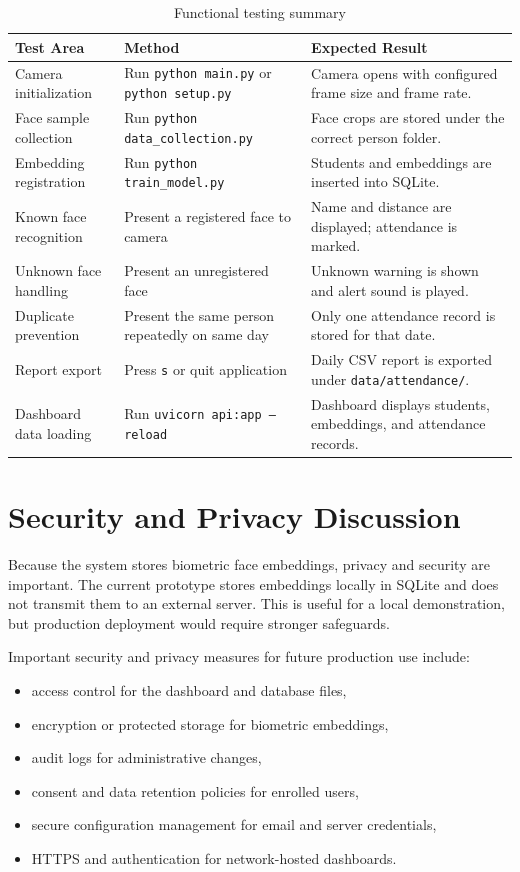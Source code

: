 \documentclass[12pt,a4paper]{report}
\newcommand{\JustifiedNormal}{\fontsize{12}{14}\selectfont\justifying\setlength{\parindent}{0pt}}
\begin{document}
\begin{longtable}{|p{}|p{}|p{}|}
\caption{Functional testing summary}\\
\hline
\textbf{Test Area} & \textbf{Method} & \textbf{Expected Result}\\
\hline
Camera initialization & Run \texttt{python main.py} or \texttt{python setup.py} & Camera opens with configured frame size and frame rate.\\
\hline
Face sample collection & Run \texttt{python data\_collection.py} & Face crops are stored under the correct person folder.\\
\hline
Embedding registration & Run \texttt{python train\_model.py} & Students and embeddings are inserted into SQLite.\\
\hline
Known face recognition & Present a registered face to camera & Name and distance are displayed; attendance is marked.\\
\hline
Unknown face handling & Present an unregistered face & Unknown warning is shown and alert sound is played.\\
\hline
Duplicate prevention & Present the same person repeatedly on same day & Only one attendance record is stored for that date.\\
\hline
Report export & Press \texttt{s} or quit application & Daily CSV report is exported under \texttt{data/attendance/}.\\
\hline
Dashboard data loading & Run \texttt{uvicorn api:app --reload} & Dashboard displays students, embeddings, and attendance records.\\
\hline
\end{longtable}

\section{Security and Privacy Discussion}
\JustifiedNormal
Because the system stores biometric face embeddings, privacy and security are important. The current prototype stores embeddings locally in SQLite and does not transmit them to an external server. This is useful for a local demonstration, but production deployment would require stronger safeguards.

Important security and privacy measures for future production use include:
\begin{itemize}[leftmargin=*]
  \item access control for the dashboard and database files,
  \item encryption or protected storage for biometric embeddings,
  \item audit logs for administrative changes,
  \item consent and data retention policies for enrolled users,
  \item secure configuration management for email and server credentials,
  \item HTTPS and authentication for network-hosted dashboards.
\end{itemize}
\end{document}
